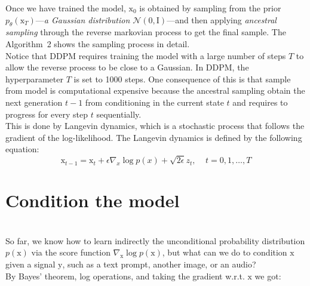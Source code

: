 Once we have trained the model, $\mathrm{x}_{0}$ is obtained by sampling from the prior $p_{\theta}(\mathrm{x}_{T})$---\textit{a Gaussian distribution $\mathcal{N}(0, \mathrm{I})$}---and then applying \textit{ancestral sampling} through the reverse markovian process to get the final sample.  The Algorithm~2 shows the sampling process in detail. \\

\noindent Notice that DDPM requires training the model with a large number of steps $T$
to allow the reverse process to be close to a Gaussian. In DDPM, the hyperparameter $T$ is set to 1000 steps. One consequence of this is that sample from model is computational expensive because the ancestral sampling obtain the next generation $t-1$ from conditioning in the current state $t$ and requires to progress for every step $t$ sequentially. \\

\noindent {} This is done by Langevin dynamics, which is a stochastic process that follows the gradient of the log-likelihood. The Langevin dynamics is defined by the following equation:
\begin{equation}
    \mathrm{x}_{t-1} = \mathrm{x}_{t} + \epsilon \nabla_{x}\log p(x) + \sqrt{2\epsilon}z_{t}, ~~~~~ t=0,1, \dots, T
\end{equation}

    
\section{Condition the model}

 \\

So far, we know how to learn indirectly the unconditional probability distribution $p(\mathrm{x})$ via the score function $\nabla_{\mathrm{x}}\log p(\mathrm{x})$, but what can we do to condition $\mathrm{x}$ given a signal $\mathrm{y}$, such as a text prompt, another image, or an audio?\\

\noindent By Bayes' theorem, log operations, and taking the gradient w.r.t. $\mathrm{x}$ we got:

